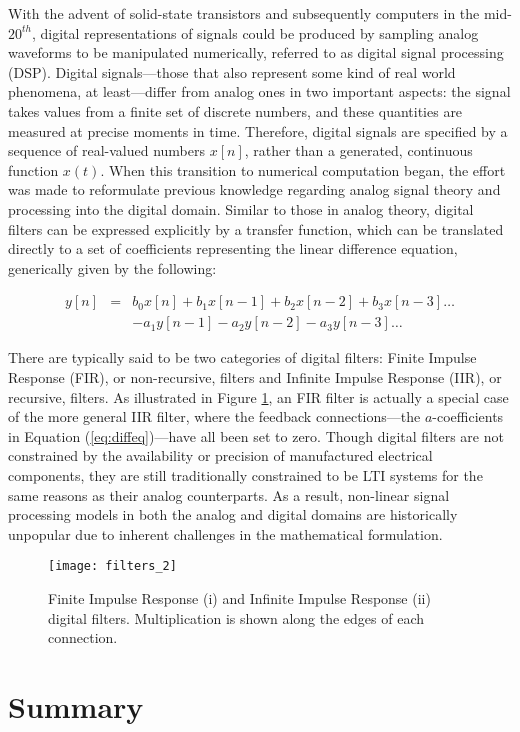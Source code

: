 With the advent of solid-state transistors and subsequently computers in the mid-$20^{th}$, digital representations of signals could be produced by sampling analog waveforms to be manipulated numerically, referred to as digital signal processing (DSP).
Digital signals---those that also represent some kind of real world phenomena, at least---differ from analog ones in two important aspects: the signal takes values from a finite set of discrete numbers, and these quantities are measured at precise moments in time.
Therefore, digital signals are specified by a sequence of real-valued numbers $x[n]$, rather than a generated, continuous function $x(t)$.
When this transition to numerical computation began, the effort was made to reformulate previous knowledge regarding analog signal theory and processing into the digital domain.
Similar to those in analog theory, digital filters can be expressed explicitly by a transfer function, which can be translated directly to a set of coefficients representing the linear difference equation, generically given by the following:

\begin{equation}
\label{eq:diffeq}
\begin{array}{rcr}
y[n] & = & b_0x[n] + b_1x[n-1] + b_2x[n-2] + b_3x[n-3] \ldots \\
 & & - a_1y[n-1] - a_2y[n-2] - a_3y[n-3] \ldots
\end{array}
\end{equation}

There are typically said to be two categories of digital filters: Finite Impulse Response (FIR), or non-recursive, filters and Infinite Impulse Response (IIR), or recursive, filters.
As illustrated in Figure \ref{fig:filters}, an FIR filter is actually a special case of the more general IIR filter, where the feedback connections---the $a$-coefficients in Equation (\ref{eq:diffeq})---have all been set to zero.
Though digital filters are not constrained by the availability or precision of manufactured electrical components, they are still traditionally constrained to be LTI systems for the same reasons as their analog counterparts.
As a result, non-linear signal processing models in both the analog and digital domains are historically unpopular due to inherent challenges in the mathematical formulation.

\begin{figure}[!t]
\centering
\texttt{[image: filters\_2]}
\caption{\small{Finite Impulse Response (i) and Infinite Impulse Response (ii) digital filters. Multiplication is shown along the edges of each connection.}}
\label{fig:filters}
\end{figure}


\section{Summary}
